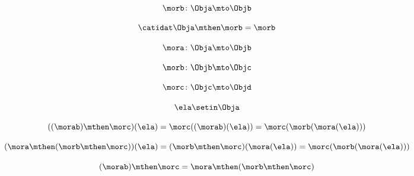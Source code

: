 \begin{forslides}
        
         \begin{equation}
            \label{eq:semicats-slides-93}
            \morb \colon \Obja \mto \Objb
        \end{equation}
        
        
         \begin{equation}
            \label{eq:semicats-slides-94}
            \catidat\Obja \mthen \morb = \morb
        \end{equation}
        
        
         \begin{equation}
            \label{eq:semicats-slides-95}
            \mora \colon \Obja \mto \Objb
        \end{equation}
        
        
         \begin{equation}
            \label{eq:semicats-slides-96}
            \morb\colon \Objb \mto \Objc
        \end{equation}
        
        
         \begin{equation}
            \label{eq:semicats-slides-97}
            \morc \colon \Objc \mto \Objd
        \end{equation}
        
        
         \begin{equation}
            \label{eq:semicats-slides-98}
            \ela \setin \Obja
        \end{equation}
        
        
         \begin{equation}
            \label{eq:semicats-slides-99}
            ((\morab) \mthen \morc)(\ela) =  \morc((\morab)(\ela)) = \morc (\morb (\mora (\ela)))
        \end{equation}
        
        
         \begin{equation}
            \label{eq:semicats-slides-99b}
            (\mora \mthen (\morb \mthen \morc))(\ela)
        =  (\morb \mthen \morc)(\mora(\ela)) = \morc (\morb (\mora (\ela)))
        \end{equation}
        
        
         \begin{equation}
            \label{eq:semicats-slides-100}
            (\morab)
        \mthen \morc = \mora \mthen (\morb \mthen \morc)
        \end{equation}
        

\end{forslides}
